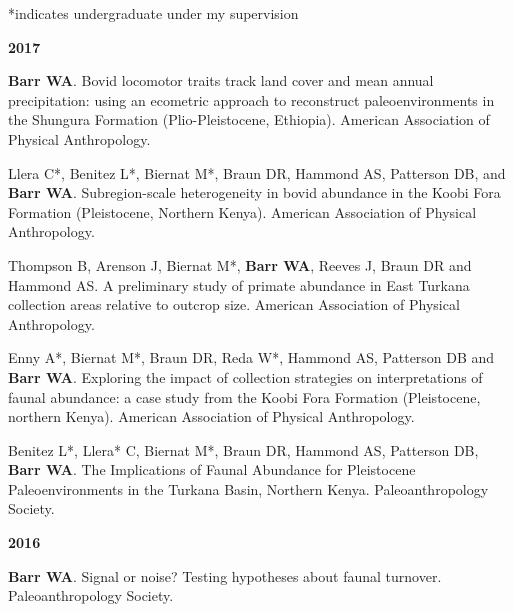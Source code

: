 \documentclass{article}
\begin{document}
\begin{description*}
\item[] *indicates undergraduate under my supervision
\end{description*}

\begin{description*}
\begin{minipage}{\linewidth}
\item[] {\bfseries 2017}
\item[] {\bfseries Barr WA}. Bovid locomotor traits track land cover and mean annual precipitation: using an ecometric approach to reconstruct paleoenvironments in the Shungura Formation (Plio-Pleistocene, Ethiopia). American Association of Physical Anthropology.
\item[] Llera C*, Benitez L*, Biernat M*, Braun DR,  Hammond AS, Patterson DB, and {\bfseries Barr WA}. Subregion-scale heterogeneity in bovid abundance in the Koobi Fora Formation (Pleistocene, Northern Kenya).  American Association of Physical Anthropology.
\item[] Thompson B, Arenson J, Biernat M*,  {\bfseries Barr WA}, Reeves J, Braun DR and Hammond AS. A preliminary study of primate abundance in East Turkana collection areas relative to outcrop size. American Association of Physical Anthropology.
\item[] Enny A*, Biernat M*, Braun DR, Reda W*, Hammond AS, Patterson DB and {\bfseries Barr WA}. Exploring the impact of collection strategies on interpretations of faunal abundance: a case study from the Koobi Fora Formation (Pleistocene, northern Kenya). American Association of Physical Anthropology.
\item[] Benitez L*, Llera* C, Biernat M*, Braun DR, Hammond AS, Patterson DB, {\bfseries Barr WA}. The Implications of Faunal Abundance for Pleistocene Paleoenvironments in the Turkana Basin, Northern Kenya. Paleoanthropology Society. 
\end{minipage}
\end{description*}



\begin{description*}
\begin{minipage}{\linewidth}
\item[] {\bfseries 2016}
\item[] {\bfseries Barr WA}. Signal or noise? Testing hypotheses about faunal turnover. Paleoanthropology Society. 
\end{minipage}
\end{description*}
\end{document}
